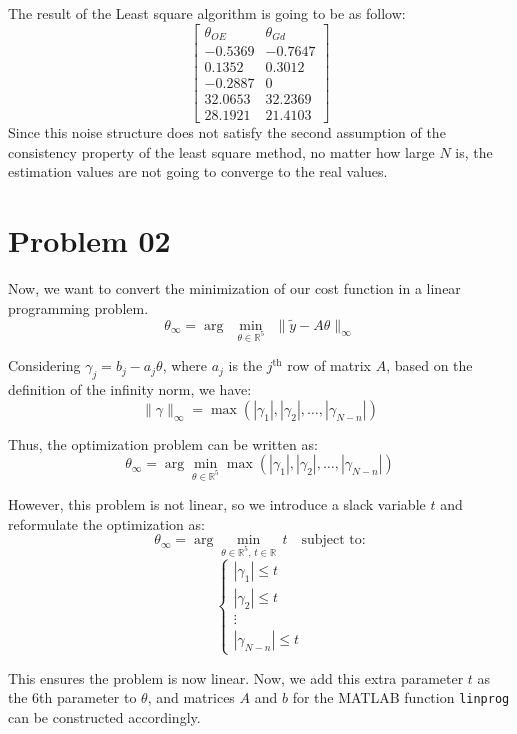 The result of the Least square algorithm is going to be as follow:
\[
\begin{bmatrix}
    \theta_{OE} & \theta_{Gd} \\
    -0.5369 & -0.7647 \\
     0.1352 & 0.3012 \\
    -0.2887 & 0 \\
    32.0653 & 32.2369 \\
    28.1921 & 21.4103
\end{bmatrix}
\]
Since this noise structure does not satisfy the second assumption of the consistency property of the least square method, no matter how large \(N\) is, the estimation values are not going to converge to the real values.

\section{Problem 02}
Now, we want to convert the minimization of our cost function in a linear programming problem.
\[
\theta_\infty = \arg\: \:\min\limits_{\theta \in \mathbb{R}^5}\:\: \|\tilde{y}-A \theta\|_\infty
\]

Considering \(\gamma_j = b_j - a_j \theta\), where \(a_j\) is the \(j^{\text{th}}\) row of matrix \(A\), based on the definition of the infinity norm, we have:
\[
\|\gamma\|_\infty = \max \left( |\gamma_1|, |\gamma_2|, \dots, |\gamma_{N-n}| \right)
\]

Thus, the optimization problem can be written as:
\[
\theta_\infty = \arg \min_{\theta \in \mathbb{R}^5} \max \left( |\gamma_1|, |\gamma_2|, \dots, |\gamma_{N-n}| \right)
\]

However, this problem is not linear, so we introduce a slack variable \(t\) and reformulate the optimization as:
\[
\theta_\infty = \arg \min_{\theta \in \mathbb{R}^5, \, t \in \mathbb{R}} \, t \quad \text{subject to:}
\]
\[
\begin{cases}
|\gamma_1| \leq t \\
|\gamma_2| \leq t \\
\vdots \\
|\gamma_{N-n}| \leq t
\end{cases}
\]

This ensures the problem is now linear. Now, we add this extra parameter \(t\) as the 6th parameter to \(\theta\), and matrices \(A\) and \(b\) for the MATLAB function \texttt{linprog} can be constructed accordingly.


